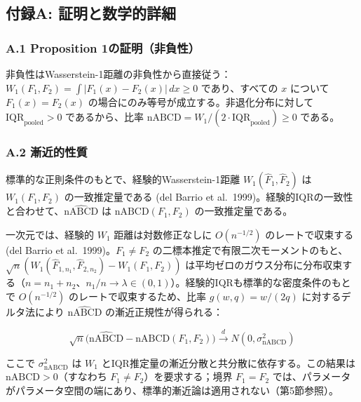 \documentclass[
  a4paper,
  11pt]{ltjsarticle}
\begin{document}
\subsection*{付録A:
証明と数学的詳細}\label{ux4ed8ux9332a-ux8a3cux660eux3068ux6570ux5b66ux7684ux8a73ux7d30}

\subsubsection*{A.1 Proposition
1の証明（非負性）}\label{a.1-proposition-1ux306eux8a3cux660eux975eux8ca0ux6027}

非負性はWasserstein-1距離の非負性から直接従う：\(W_1(F_1, F_2) = \int |F_1(x) - F_2(x)| \, dx \geq 0\)
であり、すべての \(x\) について \(F_1(x) = F_2(x)\)
の場合にのみ等号が成立する。非退化分布に対して
\(\text{IQR}_{\text{pooled}} > 0\) であるから、比率
\(\text{nABCD} = W_1 / (2 \cdot \text{IQR}_{\text{pooled}}) \geq 0\)
である。

\subsubsection*{A.2
漸近的性質}\label{a.2-ux6f38ux8fd1ux7684ux6027ux8cea}

標準的な正則条件のもとで、経験的Wasserstein-1距離
\(W_1(\hat{F}_1, \hat{F}_2)\) は \(W_1(F_1, F_2)\) の一致推定量である
(del Barrio et
al.~1999)。経験的IQRの一致性と合わせて、\(\widehat{\text{nABCD}}\) は
\(\text{nABCD}(F_1, F_2)\) の一致推定量である。

一次元では、経験的 \(W_1\) 距離は対数修正なしに \(O(n^{-1/2})\)
のレートで収束する (del Barrio et al.~1999)。\(F_1 \neq F_2\)
の二標本推定で有限二次モーメントのもと、\(\sqrt{n}(W_1(\hat{F}_{1,n_1}, \hat{F}_{2,n_2}) - W_1(F_1, F_2))\)
は平均ゼロのガウス分布に分布収束する（\(n = n_1 + n_2\)、\(n_1/n \to \lambda \in (0,1)\)）。経験的IQRも標準的な密度条件のもとで
\(O(n^{-1/2})\) のレートで収束するため、比率 \(g(w, q) = w/(2q)\)
に対するデルタ法により \(\widehat{\text{nABCD}}\)
の漸近正規性が得られる：

\[\sqrt{n}\bigl(\widehat{\text{nABCD}} - \text{nABCD}(F_1, F_2)\bigr) \xrightarrow{d} N(0, \sigma^2_{\text{nABCD}})\]

ここで \(\sigma^2_{\text{nABCD}}\) は \(W_1\)
とIQR推定量の漸近分散と共分散に依存する。この結果は
\(\text{nABCD} > 0\)（すなわち \(F_1 \neq F_2\)）を要求する；境界
\(F_1 = F_2\)
では、パラメータがパラメータ空間の端にあり、標準的漸近論は適用されない（第5節参照）。
\end{document}
